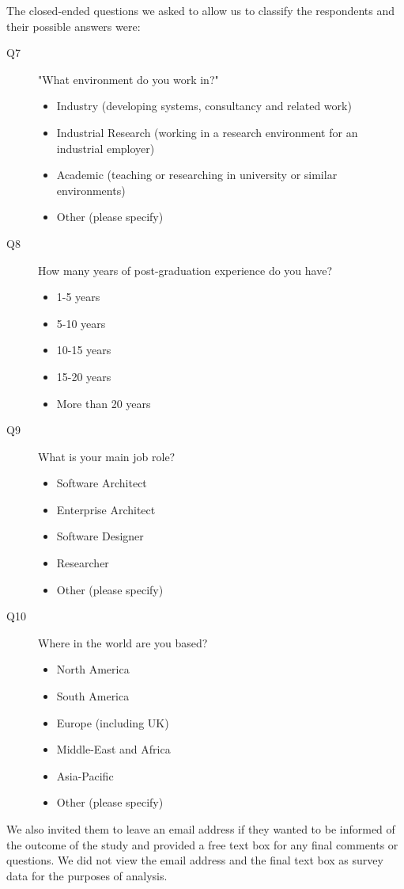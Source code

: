 The closed-ended questions we asked to allow us to classify the respondents and their possible answers were:

\begin{description}
	\item [Q7] "What environment do you work in?"
	\begin{itemize}
		\item Industry (developing systems, consultancy and related work)
		\item Industrial Research (working in a research environment for an industrial employer) 
		\item Academic (teaching or researching in university or similar environments)
		\item Other (please specify)
	\end{itemize}
	\item [Q8] How many years of post-graduation experience do you have?
	\begin{itemize}
		\item 1-5 years
		\item 5-10 years
		\item 10-15 years
		\item 15-20 years
		\item More than 20 years
    \end{itemize}
	\item [Q9] What is your main job role?
	\begin{itemize}
		\item Software Architect
		\item Enterprise Architect
		\item Software Designer
		\item Researcher
		\item Other (please specify)
    \end{itemize}
	\item [Q10] Where in the world are you based?
	\begin{itemize}
		\item North America
		\item South America 
		\item Europe (including UK) 
		\item Middle-East and Africa 
		\item Asia-Pacific
		\item Other (please specify)
	\end{itemize}
\end{description}

We also invited them to leave an email address if they wanted to be informed of the outcome of the study and provided a free text box for any final comments or questions.  We did not view the email address and the final text box as survey data for the purposes of analysis.

